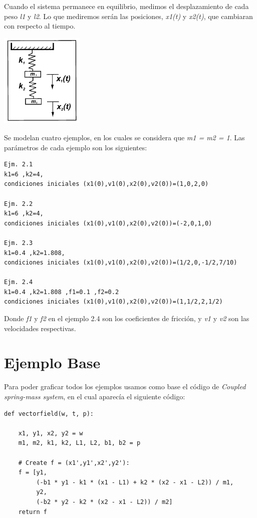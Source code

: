 \documentclass{article}
\begin{document}
\vspace{0.3cm}

Cuando el sistema permanece en equilibrio, medimos el desplazamiento de cada peso \textit{l1} y \textit{l2}. Lo que mediremos serán las posiciones, \textit{x1(t)} y \textit{x2(t)}, que cambiaran con respecto al tiempo.

\begin{center}
	\includegraphics[width=4cm]{ModeloResortesAcoplados.png}
 
\end{center}
\vspace{0.3cm}

Se modelan cuatro ejemplos, en los cuales se considera que \textit{m1 = m2 = 1}. Las parámetros de cada ejemplo son los siguientes: 

\begin{verbatim}
Ejm. 2.1
k1=6 ,k2=4, 
condiciones iniciales (x1(0),v1(0),x2(0),v2(0))=(1,0,2,0)

Ejm. 2.2
k1=6 ,k2=4, 
condiciones iniciales (x1(0),v1(0),x2(0),v2(0))=(-2,0,1,0)

Ejm. 2.3
k1=0.4 ,k2=1.808, 
condiciones iniciales (x1(0),v1(0),x2(0),v2(0))=(1/2,0,-1/2,7/10)

Ejm. 2.4
k1=0.4 ,k2=1.808 ,f1=0.1 ,f2=0.2
condiciones iniciales (x1(0),v1(0),x2(0),v2(0))=(1,1/2,2,1/2)
\end{verbatim}

Donde \textit{f1} y \textit{f2} en el ejemplo 2.4 son los coeficientes de fricción, y \textit{v1} y \textit{v2} son las velocidades respectivas.

\section{Ejemplo Base}

Para poder graficar todos los ejemplos usamos como base el código de \textit{Coupled spring-mass system}, en el cual aparecía el siguiente código:

\begin{verbatim}
def vectorfield(w, t, p):

    x1, y1, x2, y2 = w
    m1, m2, k1, k2, L1, L2, b1, b2 = p

    # Create f = (x1',y1',x2',y2'):
    f = [y1,
         (-b1 * y1 - k1 * (x1 - L1) + k2 * (x2 - x1 - L2)) / m1,
         y2,
         (-b2 * y2 - k2 * (x2 - x1 - L2)) / m2]
    return f
\end{verbatim}
\end{document}
